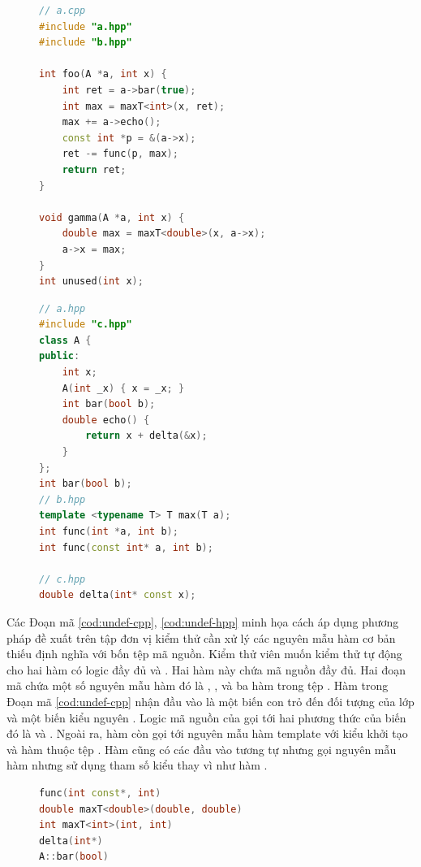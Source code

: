 \begin{figure}[t]
    \begin{minipage}[t]{0.49\linewidth}
    \begin{lstlisting}[language=C++, caption={Mã nguồn tệp a.cpp.}, label={cod:undef-cpp}, captionpos=b]
// a.cpp
#include "a.hpp"
#include "b.hpp"
    
int foo(A *a, int x) {
    int ret = a->bar(true);
    int max = maxT<int>(x, ret);
    max += a->echo();
    const int *p = &(a->x);
    ret -= func(p, max);
    return ret;
}

void gamma(A *a, int x) {
    double max = maxT<double>(x, a->x);
    a->x = max;
}
int unused(int x);
    \end{lstlisting}
    \end{minipage}
    \begin{minipage}[t]{0.49\linewidth}
    \begin{lstlisting}[language=C++, caption={Mã nguồn tệp a.hpp, b.hpp và c.hpp.}, label={cod:undef-hpp}, captionpos=b]
// a.hpp
#include "c.hpp"
class A {
public: 
    int x;
    A(int _x) { x = _x; }
    int bar(bool b);
    double echo() {
        return x + delta(&x);
    }
};
int bar(bool b);
// b.hpp
template <typename T> T max(T a);
int func(int *a, int b);
int func(const int* a, int b);
    
// c.hpp
double delta(int* const x);  
    \end{lstlisting}
\end{minipage}
\end{figure}

Các Đoạn mã \autoref{cod:undef-cpp}, \autoref{cod:undef-hpp} minh họa cách áp dụng phương pháp đề xuất trên tập đơn vị kiểm thử cần xử lý các nguyên mẫu hàm cơ bản thiếu định nghĩa với bốn tệp mã nguồn. Kiểm thử viên muốn kiểm thử tự động cho hai hàm có logic đầy đủ  và . Hai hàm này chứa mã nguồn đầy đủ. Hai đoạn mã chứa một số nguyên mẫu hàm đó là , ,  và ba hàm trong tệp . Hàm  trong Đoạn mã \autoref{cod:undef-cpp} nhận đầu vào là một biến con trỏ đến đối tượng của lớp  và một biến kiểu nguyên . Logic mã nguồn của  gọi tới hai phương thức của biến  đó là  và . Ngoài ra, hàm  còn gọi tới nguyên mẫu hàm template  với kiểu khởi tạo  và hàm  thuộc tệp . Hàm  cũng có các đầu vào tương tự nhưng gọi nguyên mẫu hàm  nhưng sử dụng tham số kiểu  thay vì  như hàm .
\vspace{5mm}
\begin{figure}[h]
	\begin{lstlisting}[language=C++, caption={Danh sách các nguyên mẫu hàm thiếu định nghĩa tìm bởi trình biên dịch.}, label={cod:result-undef}, captionpos=b]
func(int const*, int)
double maxT<double>(double, double)        
int maxT<int>(int, int)     
delta(int*)
A::bar(bool)         
	\end{lstlisting}
\end{figure}

